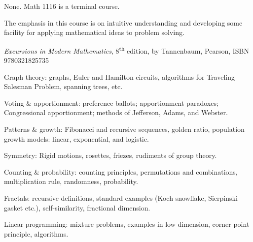 \documentclass{osucourse}
\begin{document}
\CatalogDescription
\PrerequisitesAndExclusions

\begin{FollowupCourses}
None. Math 1116 is a terminal course.
\end{FollowupCourses}

\begin{Purpose}
The emphasis in this course is on intuitive understanding and developing some facility for applying mathematical ideas to problem solving.
\end{Purpose}

\begin{Text}
\emph{Excursions in Modern Mathematics}, 8\textsuperscript{th} edition, by Tannenbaum, Pearson, ISBN 9780321825735
\end{Text}

\begin{TopicsList}
\item Graph theory: graphs, Euler and Hamilton circuits, algorithms for Traveling Salesman Problem, spanning trees, etc.
\item Voting \& apportionment: preference ballots; apportionment paradoxes; Congressional apportionment; methods of Jefferson, Adams, and Webster.
\item Patterns \& growth: Fibonacci and recursive sequences, golden ratio, population growth models: linear, exponential, and logistic.
\item Symmetry: Rigid motions, rosettes, friezes, rudiments of group theory.
\item Counting \& probability: counting principles, permutations and combinations, multiplication rule, randomness, probability.
\item Fractals: recursive definitions, standard examples (Koch snowflake, Sierpinski gasket etc.), self-similarity, fractional dimension.
\item Linear programming: mixture problems, examples in low dimension, corner point principle, algorithms.
\end{TopicsList}
\end{document}
